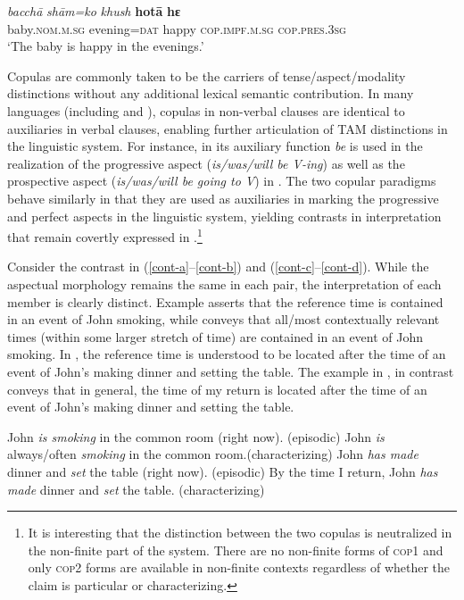 \documentclass[output=paper,hidelinks]{langscibook}
\begin{document}
\ex
\gll \emph{bacchā} \emph{shām=ko} \emph{khush} \textbf{hotā} \textbf{hɛ}\\
baby.\textsc{nom.m.sg} evening=\textsc{dat} happy \textsc{cop.impf.m.sg} \textsc{cop.pres.3sg}\\
\glt `The baby is happy in the evenings.' \label{hin1b}
\z
\z

\begin{sloppypar}
Copulas are commonly taken to be the carriers of tense/aspect/modality distinctions without any additional lexical semantic contribution. In many languages (including  and ), copulas in non-verbal clauses are identical to auxiliaries in verbal clauses, enabling further articulation of TAM distinctions in the linguistic system. For instance, in its auxiliary function \emph{be} is used in the realization of the progressive aspect (\emph{is/was/will be V-ing}) as well as the prospective aspect (\emph{is/was/will be going to V}) in . The two  copular paradigms behave similarly in that they are used as auxiliaries in marking the progressive and perfect aspects in the linguistic system, yielding contrasts in interpretation that remain covertly expressed in .\footnote{It is interesting that the distinction between the two copulas is neutralized in the non-finite part of the system. There are no non-finite forms of \textsc{cop1} and only \textsc{cop2} forms are available in non-finite contexts regardless of whether the claim is particular or characterizing.}
\end{sloppypar}

\begin{sloppypar}
Consider the contrast in (\ref{cont-a}--\ref{cont-b}) and (\ref{cont-c}--\ref{cont-d}). While the aspectual morphology remains the same in each pair, the interpretation of each member is clearly distinct. Example  asserts that the reference time is contained in an event of John smoking, while  conveys that all/most contextually relevant times (within some larger stretch of time) are contained in an event of John smoking. In , the reference time is understood to be located after the time of an event of John's making dinner and setting the table. The example in , in contrast conveys that in general, the time of my return is located after the time of an event of John's making dinner and setting the table. 
\end{sloppypar}

\ea \label{cont}
\ea John \emph{is smoking} in the common room (right now). \hfill{(episodic)} \label{cont-a}
\ex John \emph{is} always/often \emph{smoking} in the common room.\hfill{(characterizing)} \label{cont-b}
\ex John \emph{has made} dinner and \emph{set} the table (right now). \hfill{(episodic)} \label{cont-c}
\ex By the time I return, John \emph{has made} dinner and \emph{set} the table. \hfill{(characterizing)} \label{cont-d}
\z
\z
\end{document}
